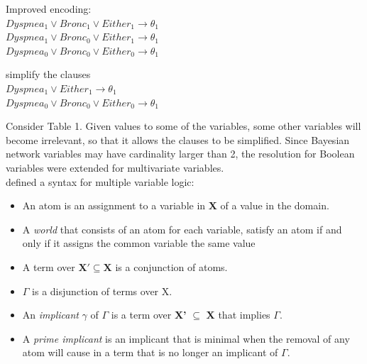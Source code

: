         \begin{multicols}{2}
        \centering
        \noindent Improved encoding:\\
        $Dyspnea_{1} \vee Bronc_{1} \vee Either_{1} \rightarrow \theta_{1}$\\
        $Dyspnea_{1} \vee Bronc_{0} \vee Either_{1} \rightarrow \theta_{1}$\\
        $Dyspnea_{0} \vee Bronc_{0} \vee Either_{0} \rightarrow \theta_{1}$\\

        \columnbreak
        
        \noindent simplify the clauses\\
        $Dyspnea_{1} \vee Either_{1} \rightarrow \theta_{1}$\\
        $Dyspnea_{0} \vee Bronc_{0} \vee Either_{0} \rightarrow \theta_{1}$\\
        \end{multicols}
        
        \noindent Consider Table 1. Given values to some of the variables, some other variables will become irrelevant, so that it allows the clauses to be simplified. Since Bayesian network variables may have cardinality larger than 2, the resolution for Boolean variables were extended for multi\-variate variables.\\
        
        \cite{2006-enc3} defined a syntax for multiple variable logic:
        \begin{itemize}
        \item An atom is an assignment to a variable in \textbf{X} of a value in the domain.
        \item A \textit{world} that consists of an atom for each variable, satisfy an atom if and only if it assigns the common variable the same value
        \item A term over $\textbf{X}' \subseteq \textbf{X}$ is a conjunction of atoms.
        \item $\Gamma$ is a disjunction of terms over X.
        \item An \textit{implicant} $\gamma$ of $\Gamma$ is a term over \textbf{X'} $\subseteq$ \textbf{X} that implies $\Gamma$.
        \item A \textit{prime implicant} is an implicant that is minimal when the removal of any atom will cause in a term that is no longer an implicant of $\Gamma$.
        \end{itemize}
        
